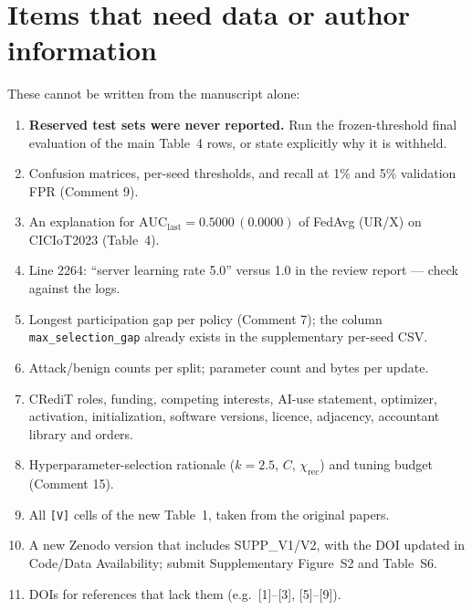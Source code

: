 \documentclass[10pt,a4paper]{article}
\begin{document}
\section{Items that need data or author information}
These cannot be written from the manuscript alone:
\begin{enumerate}[leftmargin=*,itemsep=2pt]
\item \textbf{Reserved test sets were never reported.} Run the frozen-threshold final evaluation of the main Table~4 rows, or state explicitly why it is withheld.
\item Confusion matrices, per-seed thresholds, and recall at 1\% and 5\% validation FPR (Comment 9).
\item An explanation for $\mathrm{AUC}_{\mathrm{last}}=0.5000\,(0.0000)$ of FedAvg (UR/X) on CICIoT2023 (Table~4).
\item Line 2264: ``server learning rate 5.0'' versus 1.0 in the review report --- check against the logs.
\item Longest participation gap per policy (Comment 7); the column \texttt{max\_selection\_gap} already exists in the supplementary per-seed CSV.
\item Attack/benign counts per split; parameter count and bytes per update.
\item CRediT roles, funding, competing interests, AI-use statement, optimizer, activation, initialization, software versions, licence, adjacency, accountant library and orders.
\item Hyperparameter-selection rationale ($k=2.5$, $C$, $\chi_{\mathrm{rec}}$) and tuning budget (Comment 15).
\item All \texttt{[V]} cells of the new Table~1, taken from the original papers.
\item A new Zenodo version that includes SUPP\_V1/V2, with the DOI updated in Code/Data Availability; submit Supplementary Figure~S2 and Table~S6.
\item DOIs for references that lack them (e.g.\ [1]--[3], [5]--[9]).
\end{enumerate}
\end{document}
